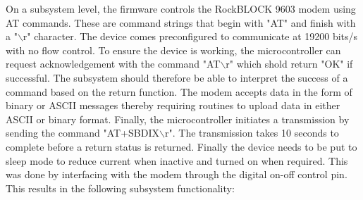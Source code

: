 On a subsystem level, the firmware controls the RockBLOCK 9603 modem using AT commands. These are command strings that begin with "AT" and finish with a "$\backslash$r" character. The device comes preconfigured to communicate at 19200 bits/s with no flow control. To ensure the device is working, the microcontroller can request acknowledgement with the command "AT$\backslash$r" which shold return "OK" if successful. The subsystem should therefore be able to interpret the success of a command based on the return function. The modem accepts data in the form of binary or ASCII messages thereby requiring routines to upload data in either ASCII or binary format. Finally, the microcontroller initiates a transmission by sending the command "AT+SBDIX$\backslash$r". The transmission takes 10 seconds to complete before a return status is returned. Finally the device needs to be put to sleep mode to reduce current when inactive and turned on when required. This was done by interfacing with the modem through the digital on-off control pin. This results in the following subsystem functionality:

\begin{table}[H]
	\centering
	\caption{Baseline functionality of the Iridium UART communication peripheral of the firmware and the test used to verify unit functionality.}
	\label{tab:iridium_subsys}
	\setlength{\extrarowheight}{5pt}
\end{table}

